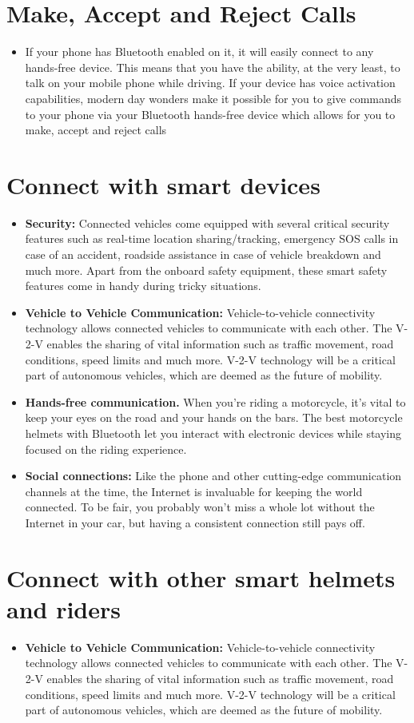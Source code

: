 \section{Make, Accept and Reject Calls }
\begin{itemize}
	\item If your phone has Bluetooth enabled on it, it will easily connect to any hands-free device. This means that you have the ability, at the very least, to talk on your mobile phone while driving. If your device has voice activation capabilities, modern day wonders make it possible for you to give commands to your phone via your Bluetooth hands-free device which allows for you to make, accept and reject calls
\end{itemize}
\section{Connect with smart devices }
\begin{itemize}
	\item \textbf{Security:} Connected vehicles come equipped with several critical security features such as real-time location sharing/tracking, emergency SOS calls in case of an accident, roadside assistance in case of vehicle breakdown and much more. Apart from the onboard safety equipment, these smart safety features come in handy during tricky situations.
	\item \textbf{Vehicle to Vehicle Communication:}
	Vehicle-to-vehicle connectivity technology allows connected vehicles to communicate with each other. The V-2-V enables the sharing of vital information such as traffic movement, road conditions, speed limits and much more. V-2-V technology will be a critical part of autonomous vehicles, which are deemed as the future of mobility.
	\item \textbf{Hands-free communication. }When you're riding a motorcycle, it's vital to keep your eyes on the road and your hands on the bars. The best motorcycle helmets with Bluetooth let you interact with electronic devices while staying focused on the riding experience.
	\item \textbf{Social connections:} Like the phone and other cutting-edge communication channels at the time, the Internet is invaluable for keeping the world connected. To be fair, you probably won’t miss a whole lot without the Internet in your car, but having a consistent connection still pays off.
\end{itemize}
\section{Connect with other smart helmets and riders }
\begin{itemize}
	\item \textbf{Vehicle to Vehicle Communication:}
	Vehicle-to-vehicle connectivity technology allows connected vehicles to communicate with each other. The V-2-V enables the sharing of vital information such as traffic movement, road conditions, speed limits and much more. V-2-V technology will be a critical part of autonomous vehicles, which are deemed as the future of mobility.
\end{itemize}
